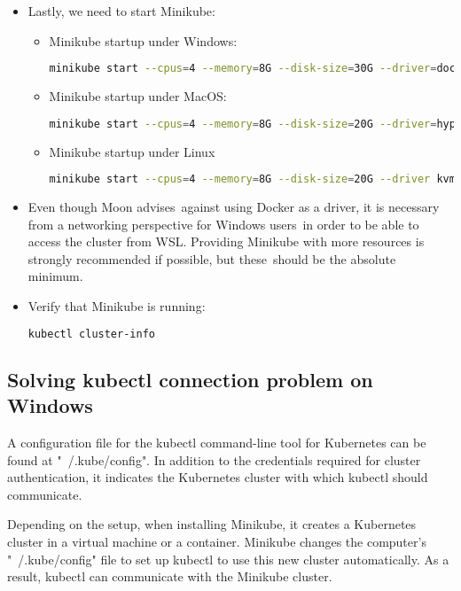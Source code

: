 \begin{itemize}
	\item Lastly, we need to start Minikube:
	\begin{itemize}
		\item Minikube startup under Windows:
		\begin{lstlisting}[language=bash]
			minikube start --cpus=4 --memory=8G --disk-size=30G --driver=docker
		\end{lstlisting}
		\item Minikube startup under MacOS:
		\begin{lstlisting}[language=bash]
			minikube start --cpus=4 --memory=8G --disk-size=20G --driver=hyperkit
		\end{lstlisting}
		\item Minikube startup under Linux
		\begin{lstlisting}[language=bash]
			minikube start --cpus=4 --memory=8G --disk-size=20G --driver kvm2
		\end{lstlisting}
	\end{itemize}
	\item Even though Moon advises against using Docker as a driver, it is necessary from a networking perspective for Windows users in order to be able to access the cluster from WSL. Providing Minikube with more resources is strongly recommended if possible, but these should be the absolute minimum.
	\item Verify that Minikube is running:
	\begin{lstlisting}[language=bash]
		kubectl cluster-info
	\end{lstlisting}
\end{itemize}

\subsection{Solving kubectl connection problem on Windows}

A configuration file for the kubectl command-line tool for Kubernetes can be found at "~/.kube/config". In addition to the credentials required for cluster authentication, it indicates the Kubernetes cluster with which kubectl should communicate.

Depending on the setup, when installing Minikube, it creates a Kubernetes cluster in a virtual machine or a container. Minikube changes the computer's "~/.kube/config" file to set up kubectl to use this new cluster automatically. As a result, kubectl can communicate with the Minikube cluster.

